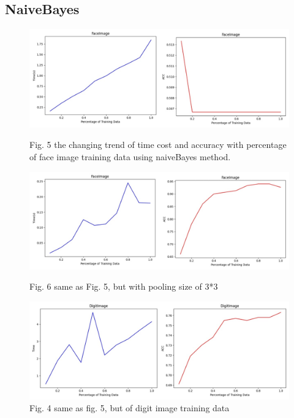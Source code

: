 \documentclass{article}
\begin{document}
\subsection{NaiveBayes}
\begin{figure}[h]
  	\center
  	\includegraphics*[scale=0.27]{fig5.jpg}
	\caption{Fig. 5 the changing trend of time cost and accuracy with percentage of face image training data using naiveBayes method.}
	\includegraphics*[scale=0.27]{fig6.jpg}
	\caption{Fig. 6 same as Fig. 5, but with pooling size of 3*3}
	\includegraphics*[scale=0.27]{fig7.jpg}
	\caption{Fig. 4 same as fig. 5, but of digit image training data}
	\label{fig:example}
  \end{figure}

\clearpage 
\end{document}
